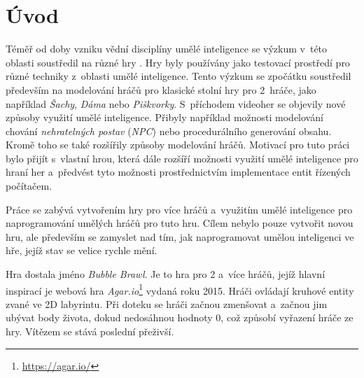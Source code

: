 \chapter{Úvod}

Téměř od doby vzniku vědní disciplíny umělé inteligence se výzkum v~této oblasti soustředil na různé hry \cite{AI_games_Yannakakis_Togelius}. Hry byly používány jako testovací prostředí pro různé techniky z~oblasti umělé inteligence. Tento výzkum se zpočátku soustředil především na modelování hráčů pro klasické stolní hry pro 2~hráče, jako například \emph{Šachy}, \emph{Dáma} nebo \emph{Piškvorky}. S~příchodem videoher se objevily nové způsoby využití umělé inteligence. Přibyly například možnosti modelování chování \emph{nehratelných postav} (\emph{NPC}) nebo procedurálního generování obsahu. Kromě toho se také rozšířily způsoby modelování hráčů. Motivací pro tuto práci bylo přijít s~vlastní hrou, která dále rozšíří možnosti využití umělé inteligence pro hraní her a~předvést tyto možnosti prostřednictvím implementace entit řízených počítačem.

Práce se zabývá vytvořením hry pro více hráčů a~využitím umělé inteligence pro naprogramování umělých hráčů pro tuto hru. Cílem nebylo pouze vytvořit novou hru, ale především se zamyslet nad tím, jak naprogramovat umělou inteligenci ve hře, jejíž stav se velice rychle mění.

Hra dostala jméno \emph{Bubble Brawl}. Je to hra pro 2 a~více hráčů, jejíž hlavní inspirací je webová hra \emph{Agar.io}\footnote{\url{https://agar.io/}} vydaná roku 2015. Hráči ovládají kruhové entity zvané  ve 2D labyrintu. Při doteku se hráči začnou zmenšovat a~začnou jim ubývat body života, dokud nedosáhnou hodnoty 0, což způsobí vyřazení hráče ze hry. Vítězem se stává poslední přeživší.



